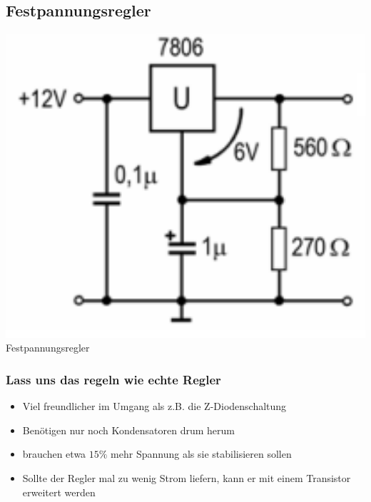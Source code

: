 \subsection*{Festpannungsregler}
\begin{frame}
    \begin{center}
        \includegraphics[width=1\textwidth]{a17/TD319.png}\\
       Festpannungsregler \cite{bna}
    \end{center}
\end{frame}

\begin{frame}
\frametitle{Lass uns das regeln wie echte Regler}
\begin{itemize}
	\item	Viel freundlicher im Umgang als z.B. die Z-Diodenschaltung
	\item	Benötigen nur noch Kondensatoren drum herum
	\item	brauchen etwa $15 \%$ mehr Spannung als sie stabilisieren sollen
	\item	Sollte der Regler mal zu wenig Strom liefern, kann er mit einem Transistor erweitert werden
\end{itemize}
\end{frame}

